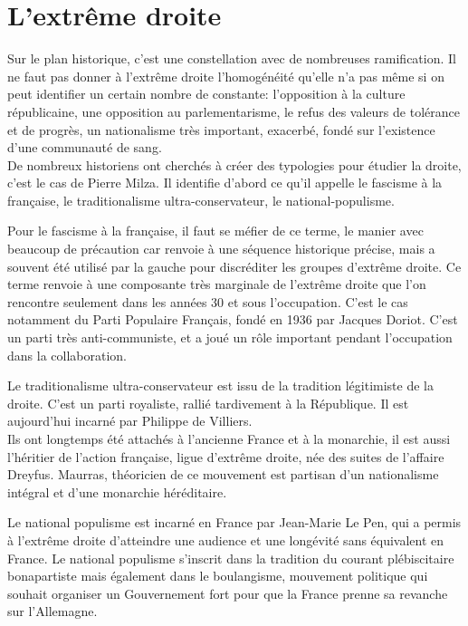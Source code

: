 \documentclass[10pt, a4paper, openany]{book}
\begin{document}
\chapter{L'extrême droite}

Sur le plan historique, c'est une constellation avec de nombreuses ramification. Il ne faut pas donner à l'extrême droite l'homogénéité qu'elle n'a pas même si on peut identifier un certain nombre de constante: l'opposition à la culture républicaine, une opposition au parlementarisme, le refus des valeurs de tolérance et de progrès, un nationalisme très important, exacerbé, fondé sur l'existence d'une communauté de sang. \\
De nombreux historiens ont cherchés à créer des typologies pour étudier la droite, c'est le cas de Pierre Milza. Il identifie d'abord ce qu'il appelle le fascisme à la française, le traditionalisme ultra-conservateur, le national-populisme. 


Pour le fascisme à la française, il faut se méfier de ce terme, le manier avec beaucoup de précaution car renvoie à une séquence historique précise, mais a souvent été utilisé par la gauche pour discréditer les groupes d'extrême droite. Ce terme renvoie à une composante très marginale de l'extrême droite que l'on rencontre seulement dans les années 30 et sous l'occupation. C'est le cas notamment du Parti Populaire Français, fondé en 1936 par Jacques Doriot. C'est un parti très anti-communiste, et a joué un rôle important pendant l'occupation dans la collaboration. 


Le traditionalisme ultra-conservateur est issu de la tradition légitimiste de la droite. C'est un parti royaliste, rallié tardivement à la République. Il est aujourd'hui incarné par Philippe de Villiers. \\
Ils ont longtemps été attachés à l'ancienne France et à la monarchie, il est aussi l'héritier de l'action française, ligue d'extrême droite, née des suites de l'affaire Dreyfus. Maurras, théoricien de ce mouvement est partisan d'un nationalisme intégral et d'une monarchie héréditaire. 


Le national populisme est incarné en France par Jean-Marie Le Pen, qui a permis à l'extrême droite d'atteindre une audience et une longévité sans équivalent en France. Le national populisme s'inscrit dans la tradition du courant plébiscitaire bonapartiste mais également dans le boulangisme, mouvement politique qui souhait organiser un Gouvernement fort pour que la France prenne sa revanche sur l'Allemagne.
\end{document}
